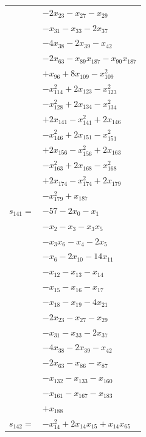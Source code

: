 \begin{longtable}{@{}r@{\;}l@{}}
 & \(\displaystyle -2x_{23} -x_{27} -x_{29}\) \\
 & \(\displaystyle -x_{31} -x_{33} -2x_{37}\) \\
 & \(\displaystyle -4x_{38} -2x_{39} -x_{42}\) \\
 & \(\displaystyle -2x_{63} -x_{89}x_{187} -x_{90}x_{187}\) \\
 & \(\displaystyle +x_{96} +8x_{109} -x_{109}^{2}\) \\
 & \(\displaystyle -x_{114}^{2} +2x_{123} -x_{123}^{2}\) \\
 & \(\displaystyle -x_{128}^{2} +2x_{134} -x_{134}^{2}\) \\
 & \(\displaystyle +2x_{141} -x_{141}^{2} +2x_{146}\) \\
 & \(\displaystyle -x_{146}^{2} +2x_{151} -x_{151}^{2}\) \\
 & \(\displaystyle +2x_{156} -x_{156}^{2} +2x_{163}\) \\
 & \(\displaystyle -x_{163}^{2} +2x_{168} -x_{168}^{2}\) \\
 & \(\displaystyle +2x_{174} -x_{174}^{2} +2x_{179}\) \\
 & \(\displaystyle -x_{179}^{2} +x_{187}\) \\[3pt]
\(s_{141}=\) & \(\displaystyle -57 -2x_{0} -x_{1}\) \\
 & \(\displaystyle -x_{2} -x_{3} -x_{3}x_{5}\) \\
 & \(\displaystyle -x_{3}x_{6} -x_{4} -2x_{5}\) \\
 & \(\displaystyle -x_{6} -2x_{10} -14x_{11}\) \\
 & \(\displaystyle -x_{12} -x_{13} -x_{14}\) \\
 & \(\displaystyle -x_{15} -x_{16} -x_{17}\) \\
 & \(\displaystyle -x_{18} -x_{19} -4x_{21}\) \\
 & \(\displaystyle -2x_{23} -x_{27} -x_{29}\) \\
 & \(\displaystyle -x_{31} -x_{33} -2x_{37}\) \\
 & \(\displaystyle -4x_{38} -2x_{39} -x_{42}\) \\
 & \(\displaystyle -2x_{63} -x_{86} -x_{87}\) \\
 & \(\displaystyle -x_{132} -x_{133} -x_{160}\) \\
 & \(\displaystyle -x_{161} -x_{167} -x_{183}\) \\
 & \(\displaystyle +x_{188}\) \\[3pt]
\(s_{142}=\) & \(\displaystyle -x_{14}^{2} +2x_{14}x_{15} +x_{14}x_{65}\) \\

\end{longtable}
